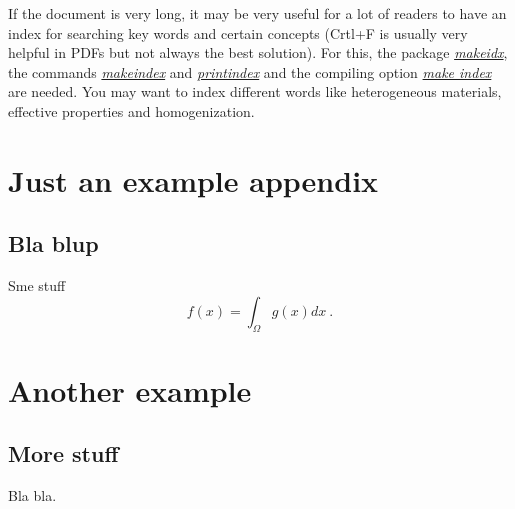 \documentclass[a4paper,11pt,oneside]{book}
\newcommand{\imp}[1]{\underline{\textit{#1}}}
\begin{document}
If the document is very long, it may be very useful for a lot of readers to have an index for searching key words and certain concepts (Crtl+F is usually very helpful in PDFs but not always the best solution). For this, the  package \imp{makeidx}, the commands \imp{makeindex} and \imp{printindex} and the compiling option \imp{make index} are needed. You may want to index different words like heterogeneous materials, effective properties and homogenization.


\begin{appendix}


\chapter{Just an example appendix}
\label{app_ex1}


\section{Bla blup}

Sme stuff
\begin{equation}
	f(x) = \int_{\Omega} g(x) dx \ .
\end{equation}


\chapter{Another example}
\label{app_ex2}


\section{More stuff}

Bla bla.

\end{appendix}
\end{document}
